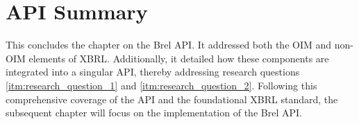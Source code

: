 

\section{API Summary}

This concludes the chapter on the Brel API.
It addressed both the OIM and non-OIM elements of XBRL.
Additionally, it detailed how these components are integrated into a singular API, thereby addressing research questions \ref{itm:research_question_1} and \ref{itm:research_question_2}.
Following this comprehensive coverage of the API and the foundational XBRL standard, the subsequent chapter will focus on the implementation of the Brel API.